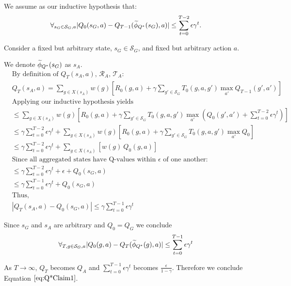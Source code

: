 We assume as our inductive hypothesis that:
\begin{equation}
\forall_{s_G \in \mathcal{S}_G, a} |Q_0(s_G, a) - Q_{T-1}(\widetilde \phi_{Q^*}(s_G), a)| \leq \sum_{t=0}^{T-2} \epsilon \gamma^t.\\
\end{equation}

Consider a fixed but arbitrary state, $s_G \in \mathcal{S}_G$, and fixed but arbitrary action $a$.

We denote $\widetilde \phi_{Q^*}(s_G)$ as $s_A$.
\begin{align*}
&\text{By definition of $Q_{T}(s_A, a)$, $\mathcal{R}_A$, $\mathcal{T}_A$:}\\
&Q_T(s_A, a) =\sum_{g \in X(s_A)}w(g)\left[ R_0(g,a) + \gamma \sum_{g' \in \mathcal{S}_G} T_0(g,a,g') \max_{a'} Q_{T-1}(g', a')      \right]\\
&\text{Applying our inductive hypothesis yields}\\
&\leq \sum_{g \in X(s_A)}w(g)\left[ R_0(g,a) + \gamma \sum_{g' \in \mathcal{S}_G} T_0(g,a,g') \max_{a'}(Q_0(g', a') + \sum_{t=0}^{T-2} \epsilon \gamma^t)      \right]\\
&\leq \gamma\sum_{t=0}^{T-2} \epsilon \gamma^t + \sum_{g \in X(s_A)}w(g)\left[ R_0(g,a) + \gamma \sum_{g' \in \mathcal{S}_G} T_0(g,a,g') \max_{a'}Q_0      \right]\\
&\leq \gamma\sum_{t=0}^{T-2} \epsilon \gamma^t + \sum_{g \in X(s_A)}\left[ w(g)\ Q_0(g,a)\right]\\
&\text{Since all aggregated states have Q-values within $\epsilon$ of one another:}\\
&\leq \gamma\sum_{t=0}^{T-2} \epsilon \gamma^t + \epsilon + Q_0(s_G, a)\\
&\leq \gamma\sum_{t=0}^{T-1} \epsilon \gamma^t + Q_0(s_G, a)\\
&\text{Thus,}\\
&\left| Q_{T}(s_A, a) - Q_0(s_G,a) \right| \leq \gamma\sum_{t=0}^{T-1}\epsilon \gamma^t
\end{align*}

Since $s_G$ and $s_A$ are arbitrary and $Q_0=Q_G$ we conclude
\begin{equation}
\forall_{T, g \in \mathcal{S}_G, a} |Q_0(g, a) - Q_T(\widetilde \phi_{Q^*}(g), a)| \leq \sum_{t=0}^{T-1} \epsilon \gamma^t
\end{equation}

As $T \rightarrow \infty$, $Q_T$ becomes $Q_A$ and $\sum_{t=0}^{T-1} \epsilon \gamma^t$ becomes $\frac{\epsilon}{1-\gamma}$. Therefore we conclude Equation $\ref{eq:Q*Claim1}$.

